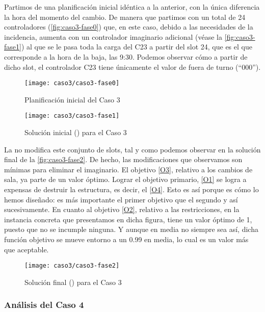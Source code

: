 Partimos de una planificación inicial idéntica a la anterior, con la única diferencia la hora del momento del cambio. De manera que partimos con un total de 24 controladores (\autoref{fig:caso3-fase0}) que, en este caso, debido a las necesidades de la incidencia, aumenta con un controlador imaginario adicional (véase la \autoref{fig:caso3-fase1}) al que se le pasa toda la carga del C23 a partir del slot 24, que es el que corresponde a la hora de la baja, las 9:30. Podemos observar cómo a partir de dicho slot, el controlador C23 tiene únicamente el valor de fuera de turno (``000'').

\begin{figure}
	\centering
	\texttt{[image: caso3/caso3-fase0]}
	\caption{Planificación inicial del Caso 3}
	\label{fig:caso3-fase0}
\end{figure}

\begin{figure}
	\centering
	\texttt{[image: caso3/caso3-fase1]}
	\caption{Solución inicial (\faseuno{}) para el Caso 3}
	\label{fig:caso3-fase1}
\end{figure}

La \fasedos{} no modifica este conjunto de slots, tal y como podemos observar en la solución final de la \autoref{fig:caso3-fase2}. De hecho, las modificaciones que observamos son mínimas para eliminar el imaginario. El objetivo \ref{O3}, relativo a los cambios de sala, ya parte de un valor óptimo. Lograr el objetivo primario, \ref{O1} se logra a expensas de destruir la estructura, es decir, el \ref{O4}. Esto es así porque es cómo lo hemos diseñado: es más importante el primer objetivo que el segundo y así sucesivamente. En cuanto al objetivo \ref{O2}, relativo a las restricciones, en la instancia concreta que presentamos en dicha figura, tiene un valor óptimo de 1, puesto que no se incumple ninguna. Y aunque en media no siempre sea así, dicha función objetivo se mueve entorno a un 0.99 en media, lo cual es un valor más que aceptable.

\begin{figure}[!h]
	\centering
	\texttt{[image: caso3/caso3-fase2]}
	\caption{Solución final (\fasedos{}) para el Caso 3}
	\label{fig:caso3-fase2}
\end{figure}

\subsubsection{Análisis del Caso 4}

